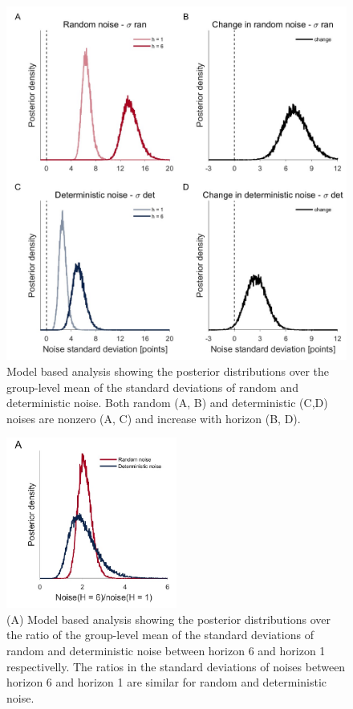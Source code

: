 \documentclass[12pt]{article}
\begin{document}
{\begin{figure}[H]
\begin{center}
	\includegraphics[width=\textwidth]{figures/RDBayes_hyperprior.jpg}
	\caption{Model based analysis showing the posterior distributions over the group-level mean of the standard deviations of  random and deterministic noise. Both random (A, B) and deterministic (C,D) noises are nonzero (A, C) and increase with horizon (B, D).  }
	\label{fig:mb1}
\end{center}
\end{figure}

\begin{figure}[H]
\begin{center}
	\includegraphics[width=0.5\textwidth]{figures/RDBayes_ratio__paironly.jpg}
	\caption{(A) Model based analysis showing the posterior distributions over the ratio of the group-level mean of the standard deviations of  random and deterministic noise between horizon 6 and horizon 1 respectivelly. The ratios in the standard deviations of noises between horizon 6 and horizon 1 are similar for random and deterministic noise.}
	\label{fig:ratio}
\end{center}
\end{figure}

}
\end{document}
